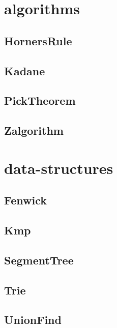 \section{algorithms}
\subsection{ HornersRule}
\raggedbottom
\hrulefill
\subsection{ Kadane}
\raggedbottom
\hrulefill
\subsection{ PickTheorem}
\raggedbottom
\hrulefill
\subsection{ Zalgorithm}
\raggedbottom
\hrulefill

\section{data-structures}
\subsection{ Fenwick}
\raggedbottom
\hrulefill
\subsection{ Kmp}
\raggedbottom
\hrulefill
\subsection{ SegmentTree}
\raggedbottom
\hrulefill
\subsection{ Trie}
\raggedbottom
\hrulefill
\subsection{ UnionFind}
\raggedbottom
\hrulefill

